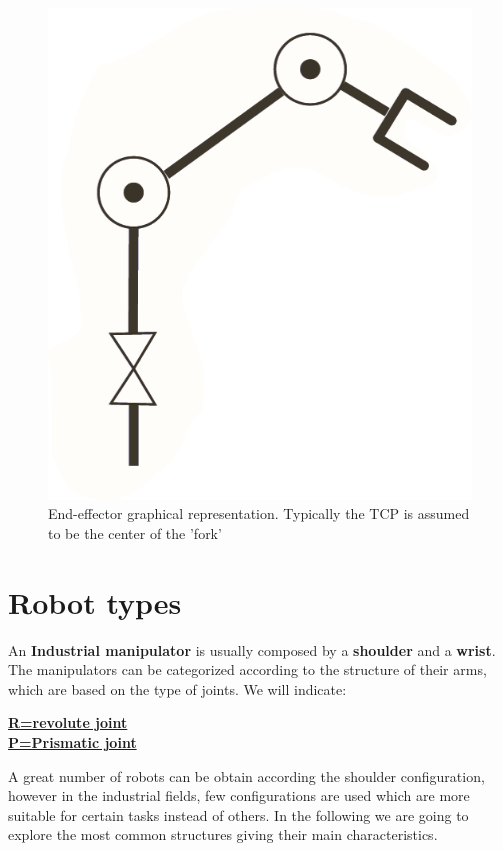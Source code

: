 \begin{figure}
    \centering
    \includegraphics[scale=0.4]{img/endeff_graphical.png}
    \caption{End-effector graphical representation. Typically the TCP is assumed to be the center of the 'fork'}
\end{figure}




\section{Robot types}
An \textbf{Industrial manipulator} is usually composed by a \textbf{shoulder} and a \textbf{wrist}. The manipulators can be categorized according to the structure of their arms, which are based on the type of joints. We will indicate:
\begin{center}
    \underline{\textbf{R=revolute joint}}\\
    \underline{\textbf{P=Prismatic joint}}
\end{center}
A great number of robots can be obtain according the shoulder configuration, however in the industrial fields, few configurations are used which are more suitable for certain tasks instead of others. In the following we are going to explore the most common structures giving their main characteristics.

